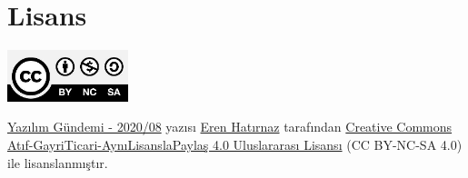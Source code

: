 \documentclass[11pt]{article}
\begin{document}
\section{Lisans}
\label{sec:orgb41b595}
\begin{center}
\begin{center}
\includegraphics[height=1.5cm]{../../../img/CC_BY-NC-SA_4.0.png}
\end{center}

\href{yazilim-gundemi-2020-08.pdf}{Yazılım Gündemi - 2020/08} yazısı \href{https://erenhatirnaz.github.io}{Eren Hatırnaz} tarafından \href{http://creativecommons.org/licenses/by-nc-sa/4.0/}{Creative Commons
Atıf-GayriTicari-AynıLisanslaPaylaş 4.0 Uluslararası Lisansı} (CC BY-NC-SA 4.0)
ile lisanslanmıştır.
\end{center}
\end{document}
